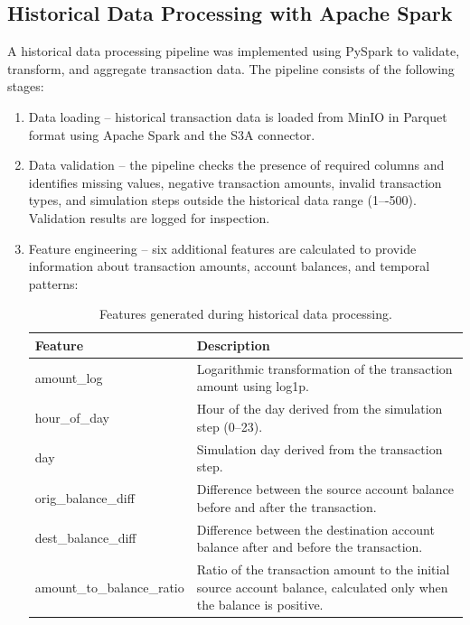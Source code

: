 \documentclass[titlepage]{article}
\begin{document}
\subsection{Historical Data Processing with Apache Spark}\label{sec:historical}
A historical data processing pipeline was implemented using PySpark to validate, transform, and aggregate transaction data. The pipeline consists of the following stages:
\begin{enumerate}
    \item Data loading -- historical transaction data is loaded from MinIO in Parquet format using Apache Spark and the S3A connector.
    \item Data validation -- the pipeline checks the presence of required columns and identifies missing values, negative transaction amounts, invalid transaction types, and simulation steps outside the historical data range (1–-500). Validation results are logged for inspection.
    \item Feature engineering -- six additional features are calculated to provide information about transaction amounts, account balances, and temporal patterns:
    \begin{table}[H]
    \centering
    \caption{Features generated during historical data processing.}
    \label{tab:historical_features}
    \small
    \begin{tabular}{lp{9cm}}
        \toprule
        \textbf{Feature} & \textbf{Description}\\
        \midrule
        amount\_log & Logarithmic transformation of the transaction amount using log1p.\\
        hour\_of\_day & Hour of the day derived from the simulation step (0--23).\\
        day & Simulation day derived from the transaction step.\\
        orig\_balance\_diff & Difference between the source account balance before and after the transaction.\\
        dest\_balance\_diff & Difference between the destination account balance after and before the transaction.\\
        amount\_to\_balance\_ratio & Ratio of the transaction amount to the initial source account balance, calculated only when the balance is positive.\\
        \bottomrule
    \end{tabular}
    \end{table}


\end{enumerate}
\end{document}
